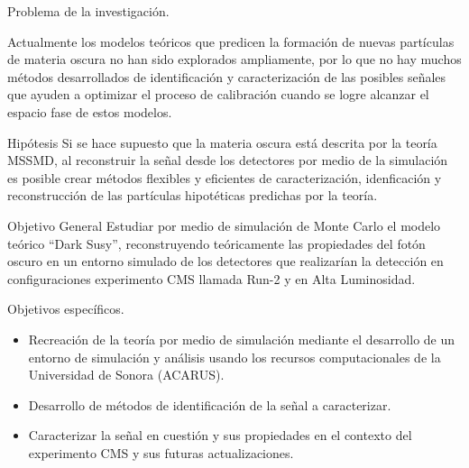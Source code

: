 \begin{frame}{Problema de la investigaci\'on.}

Actualmente los modelos te\'oricos que predicen la formaci\'on de nuevas part\'iculas de materia oscura no han sido explorados ampliamente, por lo que no hay muchos m\'etodos desarrollados de identificaci\'on y caracterizaci\'on de las posibles se\~nales que ayuden a optimizar el proceso de calibraci\'on cuando se logre alcanzar el espacio fase de estos modelos.

\end{frame}


\begin{frame}{Hip\'otesis}
Si se hace supuesto que la materia oscura est\'a descrita por la teor\'ia MSSMD, al reconstruir la se\~nal desde los detectores por medio de la simulaci\'on es posible crear m\'etodos flexibles y eficientes de caracterizaci\'on, idenficaci\'on y reconstrucci\'on de las part\'iculas hipot\'eticas predichas por la teor\'ia.
\end{frame}


\begin{frame}{Objetivo General}
Estudiar por medio de simulaci\'on de Monte Carlo el modelo te\'orico ``Dark Susy'', reconstruyendo te\'oricamente las propiedades del fot\'on oscuro en un entorno simulado de los detectores que realizar\'ian la detecci\'on en configuraciones experimento CMS llamada Run-2 y en Alta Luminosidad.

\end{frame}


\begin{frame}{Objetivos espec\'ificos.}

\begin{itemize}
\item Recreaci\'on de la teor\'ia por medio de simulaci\'on mediante el desarrollo de un entorno de simulaci\'on y an\'alisis usando los recursos computacionales de la Universidad de Sonora (ACARUS).
\item Desarrollo de m\'etodos de identificaci\'on de la se\~nal a caracterizar.
\item Caracterizar la se\~nal en cuesti\'on y sus propiedades en el contexto del experimento CMS y sus futuras actualizaciones.
\end{itemize}
\end{frame}

